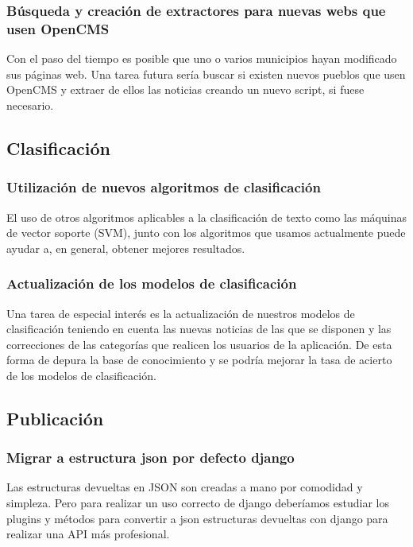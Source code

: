 \subsubsection{Búsqueda y creación de extractores para nuevas webs que usen OpenCMS}

Con el paso del tiempo es posible que uno o varios municipios hayan modificado sus páginas web. Una tarea futura sería buscar si existen nuevos pueblos que usen OpenCMS y extraer de ellos las noticias creando un nuevo script, si fuese necesario.
\subsection{Clasificación}


\subsubsection{Utilización de nuevos algoritmos de clasificación}

El uso de otros algoritmos aplicables a la clasificación de texto como las máquinas de vector soporte (SVM), junto con los algoritmos que usamos actualmente puede ayudar a, en general, obtener mejores resultados.

\subsubsection{Actualización de los modelos de clasificación}
Una tarea de especial interés es la actualización de nuestros modelos de clasificación teniendo en cuenta las nuevas noticias de las que se disponen y las correcciones de las categorías que realicen los usuarios de la aplicación. De esta forma de depura la base de conocimiento y se podría mejorar la tasa de acierto de los modelos de clasificación.


\subsection{Publicación}

\subsubsection{Migrar a estructura json por defecto django}
Las estructuras devueltas en JSON son creadas a mano por comodidad y simpleza. Pero para realizar un uso correcto de django deberíamos estudiar los plugins y métodos para convertir a json estructuras devueltas con django para realizar una API más profesional.

